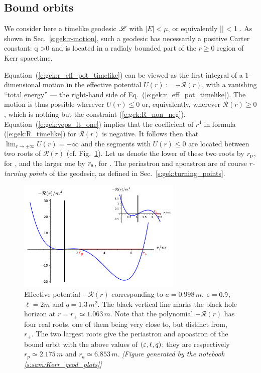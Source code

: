 \subsection{Bound orbits}

We consider here a timelike geodesic $\mathscr{L}$ with $|E|< \mu$, or equivalently
\be \label{e:gek:veps_lt_one}
    |\veps| < 1 .
\ee
As shown in Sec.~\ref{s:gek:r-motion}, such a geodesic has necessarily a positive
Carter constant:
\be
    q >0
\ee
and is located in a radialy bounded part of the $r\geq 0$ region of Kerr spacetime.

Equation~(\ref{e:gek:r_eff_pot_timelike}) can be viewed as the first-integral of
a 1-dimensional motion in the effective potential $U(r) := - \mathcal{R}(r)$,
with a vanishing ``total energy'' --- the right-hand side of Eq.~(\ref{e:gek:r_eff_pot_timelike}).
The motion is thus possible wherever $U(r) \leq 0$ or, equivalently, wherever
$\mathcal{R}(r) \geq 0$, which is nothing but the constraint (\ref{e:gek:R_non_neg}).
Equation~(\ref{e:gek:veps_lt_one})
implies that the coefficient of $r^4$ in formula
(\ref{e:gek:R_timelike}) for $\mathcal{R}(r)$ is negative. It follows then that
$\lim_{r\to\pm\infty} U(r) = +\infty$ and the segments with $U(r) \leq 0$
are located between two roots of $\mathcal{R}(r)$ (cf. Fig.~\ref{f:gek:R_potential}).
Let us denote the lower of these two roots by $r_{\rm p}$, for , and the larger one by $r_{\rm a}$, for .
The periastron and apoastron are of course \emph{$r$-turning points} of the geodesic,
as defined in Sec.~\ref{s:gek:turning_points}.

\begin{figure}
\centerline{\includegraphics[width=0.7\textwidth]{gek_R_potential.pdf}}
\caption[]{\label{f:gek:R_potential} \footnotesize
Effective potential $-\mathcal{R}(r)$ corresponding to $a=0.998\, m$,
$\varepsilon=0.9$, $\ell=2 m$ and $q=1.3\, m^2$. The black vertical line
marks the black hole horizon at $r=r_+\simeq 1.063\, m$.
Note that the polynomial $-\mathcal{R}(r)$
has four real roots, one of them being very close to, but distinct from, $r_+$.
The two largest roots give the periastron and apoastron of the bound orbit
with the above values of $(\varepsilon,\ell,q)$; they
are respectively $r_p \simeq 2.175\, m$ and
$r_a \simeq 6.853\, m$.
\textsl{[Figure generated by the notebook \ref{s:sam:Kerr_geod_plots}]}
}
\end{figure}

